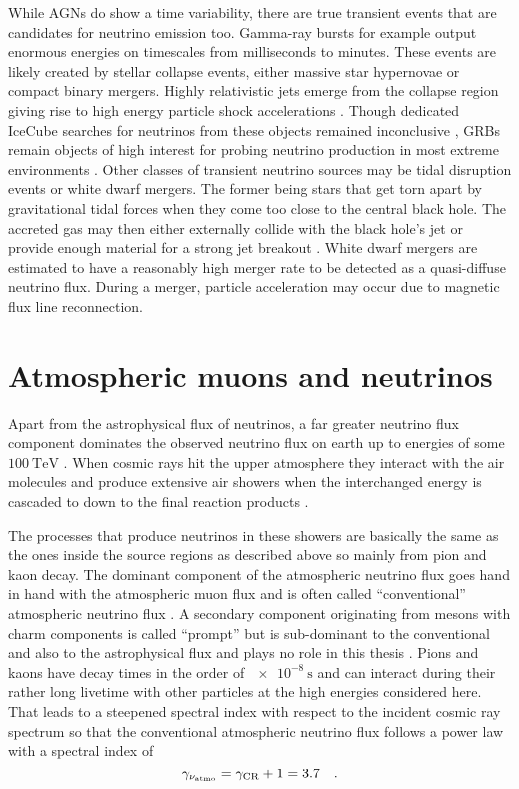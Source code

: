 While AGNs do show a time variability, there are true transient events that are candidates for neutrino emission too.
Gamma-ray bursts for example output enormous energies on timescales from milliseconds to minutes.
These events are likely created by stellar collapse events, either massive star hypernovae or compact binary mergers.
Highly relativistic jets emerge from the collapse region giving rise to high energy particle shock accelerations .
Though dedicated IceCube searches for neutrinos from these objects remained inconclusive , GRBs remain objects of high interest for probing neutrino production in most extreme environments .
Other classes of transient neutrino sources may be tidal disruption events or white dwarf mergers.
The former being stars that get torn apart by gravitational tidal forces when they come too close to the central black hole.
The accreted gas may then either externally collide with the black hole's jet or provide enough material for a strong jet breakout .
White dwarf mergers are estimated to have a reasonably high merger rate to be detected as a quasi-diffuse neutrino flux.
During a merger, particle acceleration may occur due to magnetic flux line reconnection.


\section{Atmospheric muons and neutrinos}
Apart from the astrophysical flux of neutrinos, a far greater neutrino flux component dominates the observed neutrino flux on earth up to energies of some $\SI{100}{\TeV}$ .
When cosmic rays hit the upper atmosphere they interact with the air molecules and produce extensive air showers when the interchanged energy is cascaded to down to the final reaction products .

The processes that produce neutrinos in these showers are basically the same as the ones inside the source regions as described above so mainly from pion and kaon decay.
The dominant component of the atmospheric neutrino flux goes hand in hand with the atmospheric muon flux and is often called \enquote{conventional} atmospheric neutrino flux .
A secondary component originating from mesons with charm components is called \enquote{prompt} but is sub-dominant to the conventional and also to the astrophysical flux and plays no role in this thesis .
Pions and kaons have decay times in the order of $\SI{e-8}{\s}$ and can interact during their rather long livetime with other particles at the high energies considered here.
That leads to a steepened spectral index with respect to the incident cosmic ray spectrum so that the conventional atmospheric neutrino flux follows a power law with a spectral index of 
\begin{equation}
  \gamma_{\nu_\text{atmo}} = \gamma_\text{CR} + 1 = 3.7
  \quad\text{.}
\end{equation}